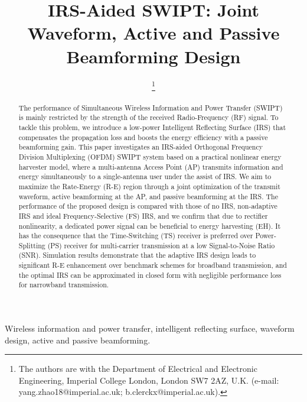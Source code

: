 \documentclass[journal]{IEEEtran}
\begin{document}
	\title{IRS-Aided SWIPT: Joint Waveform, Active and Passive Beamforming Design}
	\author{
		\thanks{
			The authors are with the Department of Electrical and Electronic Engineering, Imperial College London, London SW7 2AZ, U.K. (e-mail: yang.zhao18@imperial.ac.uk; b.clerckx@imperial.ac.uk).
		}
	}
	\maketitle


	\begin{abstract}
		The performance of Simultaneous Wireless Information and Power Transfer (SWIPT) is mainly restricted by the strength of the received Radio-Frequency (RF) signal. To tackle this problem, we introduce a low-power Intelligent Reflecting Surface (IRS) that compensates the propagation loss and boosts the energy efficiency with a passive beamforming gain. This paper investigates an IRS-aided Orthogonal Frequency Division Multiplexing (OFDM) SWIPT system based on a practical nonlinear energy harvester model, where a multi-antenna Access Point (AP) transmits information and energy simultaneously to a single-antenna user under the assist of IRS. We aim to maximize the Rate-Energy (R-E) region through a joint optimization of the transmit waveform, active beamforming at the AP, and passive beamforming at the IRS. The performance of the proposed design is compared with those of no IRS, non-adaptive IRS and ideal Frequency-Selective (FS) IRS, and we confirm that due to rectifier nonlinearity, a dedicated power signal can be beneficial to energy harvesting (EH). It has the consequence that the Time-Switching (TS) receiver is preferred over Power-Splitting (PS) receiver for multi-carrier transmission at a low Signal-to-Noise Ratio (SNR). Simulation results demonstrate that the adaptive IRS design leads to significant R-E enhancement over benchmark schemes for broadband transmission, and the optimal IRS can be approximated in closed form with negligible performance loss for narrowband transmission.
	\end{abstract}


	\begin{IEEEkeywords}
		Wireless information and power transfer, intelligent reflecting surface, waveform design, active and passive beamforming.
	\end{IEEEkeywords}
\end{document}
